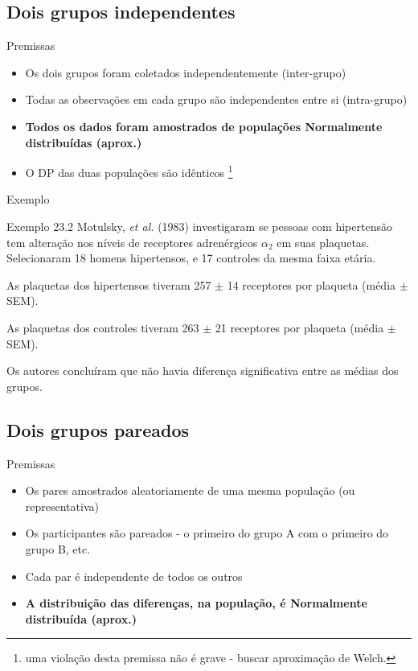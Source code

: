 \documentclass{beamer}
\begin{document}
\subsection{Dois grupos independentes}

\begin{frame}{Premissas}
  \begin{itemize}
  \item Os dois grupos foram coletados independentemente (inter-grupo)
  \item Todas as observações em cada grupo são independentes entre si (intra-grupo)
  \item {\bf Todos os dados foram amostrados de populações Normalmente distribuídas (aprox.)}
  \item O DP das duas populações são idênticos \footnote{uma violação desta premissa não é grave - buscar aproximação de Welch.}
  \end{itemize}
\end{frame}

\begin{frame}{Exemplo}
  \begin{exampleblock}{Exemplo 23.2}
    Motulsky, {\em et al.} (1983) investigaram se pessoas com hipertensão tem alteração nos níveis de receptores adrenérgicos $\alpha_2$ em suas plaquetas.
    Selecionaram 18 homens hipertensos, e 17 controles da mesma faixa etária.

    As plaquetas dos hipertensos tiveram 257 $\pm$ 14 receptores por plaqueta (média $\pm$ SEM).

    As plaquetas dos controles tiveram 263 $\pm$ 21 receptores por plaqueta (média $\pm$ SEM).

    \bigskip
    Os autores concluíram que não havia diferença significativa entre as médias dos grupos.
  \end{exampleblock}
\end{frame}

\subsection{Dois grupos pareados}

\begin{frame}{Premissas}
  \begin{itemize}
  \item Os pares amostrados aleatoriamente de uma mesma população (ou representativa)
  \item Os participantes são pareados - o primeiro do grupo A com o primeiro do grupo B, etc.
  \item Cada par é independente de todos os outros
  \item {\bf A distribuição das diferenças, na população, é Normalmente distribuída (aprox.)}
  \end{itemize}
\end{frame}
\end{document}

